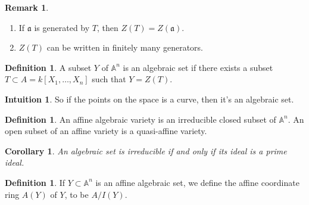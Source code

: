 \documentclass[11pt]{book}
\newtheorem{corollary}[theorem]{Corollary}
\theoremstyle{definition}
\newtheorem{definition}[theorem]{Definition}
\newtheorem{remark}[theorem]{Remark}
\newtheorem{intuition}[theorem]{Intuition}
\numberwithin{equation}{section}
\begin{document}
\begin{rembox}
\begin{remark}
    \begin{enumerate}
        \item If \(\mathfrak{a}\) is generated by \(T\), then \(Z(T) = Z(\mathfrak{a})\).
        \item \(Z(T)\) can be written in finitely many generators.
    \end{enumerate}
\end{remark}
\end{rembox}


\begin{defbox}
    \begin{definition}
        A subset \(Y\) of \(\mathbb{A}^n\) is an algebraic set if there exists a subset \(T \subset A = k[X_1, \ldots, X_n]\) such that \(Y = Z(T)\).
    \end{definition}
\end{defbox}
\begin{intbox}
    \begin{intuition}
        So if the points on the space is a curve, then it's an algebraic set.
    \end{intuition}
\end{intbox}

\begin{defbox}
    \begin{definition}
        \label{def:algebraic_variety}
        An affine algebraic variety is an irreducible closed subset of \(\mathbb{A}^n\). An open subset of an affine variety is a quasi-affine variety.
    \end{definition}
\end{defbox}

\begin{thmbox}
\begin{corollary}
    \label{cor:ideal_correspondence}
    An algebraic set is irreducible if and only if its ideal is a prime ideal.
\end{corollary}
\end{thmbox}

\begin{defbox}
    \begin{definition}
        \label{def:affine_coordinate_ring}
        If \(Y \subset \mathbb{A}^n\) is an affine algebraic set, we define the affine coordinate ring \(A(Y)\) of \(Y\), to be \(A / I(Y)\). 
    \end{definition}
\end{defbox}
\end{document}
